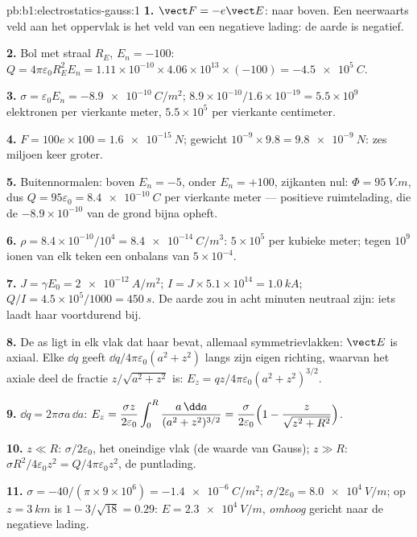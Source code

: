 \begin{solution}{pb:b1:electrostatics-gauss:1}
\textbf{1.} $\vect F = -e\vect E$: naar boven. Een neerwaarts veld aan het oppervlak
is het veld van een negatieve lading: de aarde is negatief.

\textbf{2.} Bol met straal $R_E$, $E_n = -100$: $Q = 4\pi\varepsilon_0R_E^2E_n =
1.11 \times 10^{-10} \times 4.06 \times 10^{13} \times (-100) = \qty{-4.5e5}{C}$.

\textbf{3.} $\sigma = \varepsilon_0E_n = \qty{-8.9e-10}{C/m^2}$; $8.9 \times 10^{-10}/1.6 \times
10^{-19} = 5.5 \times 10^9$ elektronen per vierkante meter, $5.5 \times 10^5$ per
vierkante centimeter.

\textbf{4.} $F = 100e \times 100 = \qty{1.6e-15}{N}$; gewicht $10^{-9} \times 9.8 =
\qty{9.8e-9}{N}$: zes miljoen keer groter.

\textbf{5.} Buitennormalen: boven $E_n = -5$, onder $E_n = +100$, zijkanten
nul: $\Phi = \qty{95}{V.m}$, dus $Q = 95\varepsilon_0 = \qty{+8.4e-10}{C}$ per vierkante
meter --- positieve ruimtelading, die de $-8.9 \times 10^{-10}$ van de grond
bijna opheft.

\textbf{6.} $\rho = 8.4 \times 10^{-10}/10^4 = \qty{8.4e-14}{C/m^3}$: $5 \times 10^5$
 per kubieke meter; tegen $10^9$ ionen van elk teken
een onbalans van $5 \times 10^{-4}$.

\textbf{7.} $J = \gamma E_0 = \qty{2e-12}{A/m^2}$; $I = J \times 5.1 \times 10^{14} =
\qty{1.0}{kA}$; $Q/I = 4.5 \times 10^5/1000 = \qty{450}{s}$. De aarde zou in
acht minuten neutraal zijn: iets laadt haar voortdurend bij.

\textbf{8.} De as ligt in elk vlak dat haar bevat, allemaal symmetrievlakken:
$\vect E$ is axiaal. Elke $\dd q$ geeft $\dd q/4\pi\varepsilon_0(a^2 + z^2)$
langs zijn eigen richting, waarvan het axiale deel de fractie
$z/\sqrt{a^2 + z^2}$ is: $E_z = qz/4\pi\varepsilon_0(a^2 + z^2)^{3/2}$.

\textbf{9.} $\dd q = 2\pi\sigma a\,\dd a$: $E_z = \dfrac{\sigma z}{2\varepsilon_0}\displaystyle\int_0^R
\dfrac{a\,\dd a}{(a^2 + z^2)^{3/2}} = \dfrac{\sigma}{2\varepsilon_0}\Bigl(1 - \dfrac{z}{\sqrt{z^2
+ R^2}}\Bigr)$.

\textbf{10.} $z \ll R$: $\sigma/2\varepsilon_0$, het oneindige vlak (de waarde van Gauss);
$z \gg R$: $\sigma R^2/4\varepsilon_0z^2 = Q/4\pi\varepsilon_0z^2$, de puntlading.

\textbf{11.} $\sigma = -40/(\pi \times 9 \times 10^6) = \qty{-1.4e-6}{C/m^2}$; $\sigma/2\varepsilon_0 =
\qty{8.0e4}{V/m}$; op $z = \qty{3}{km}$ is $1 - 3/\sqrt{18} = 0.29$: $E =
\qty{2.3e4}{V/m}$, \emph{omhoog} gericht naar de negatieve lading.


\end{solution}
